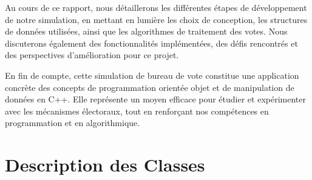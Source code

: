 \documentclass[12pt]{article} %
\begin{document}
	Au cours de ce rapport, nous détaillerons les différentes étapes de développement de notre simulation, en mettant en lumière les choix de conception, les structures de données utilisées, ainsi que les algorithmes de traitement des votes. Nous discuterons également des fonctionnalités implémentées, des défis rencontrés et des perspectives d'amélioration pour ce projet.
	
	En fin de compte, cette simulation de bureau de vote constitue une application concrète des concepts de programmation orientée objet et de manipulation de données en C++. Elle représente un moyen efficace pour étudier et expérimenter avec les mécanismes électoraux, tout en renforçant nos compétences en programmation et en algorithmique.
	
	\newpage
	
\section*{Description des Classes}
\end{document}
